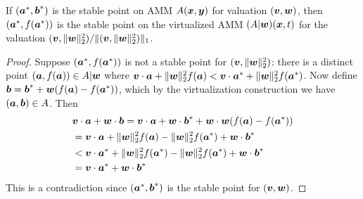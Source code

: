 \begin{lemma}
\sloppy
    If $(\ba^{*},\bb^{*})$ is the stable point on AMM $A(\bx,\by)$ for valuation $(\bv,\bw)$,
    then $(\ba^{*},f(\ba^{*}))$ is the stable point on the virtualized AMM $(A| \bw)(\bx,t)$
    for the valuation $(\bv,\|\bw\|^2_2) / \| (\bv,\|\bw\|^2_2) \|_1$.
\end{lemma}

\begin{proof}
\sloppy
    Suppose $(\ba^{*},f(\ba^{*}))$ is not a stable point for $(\bv,\|\bw\|^2_2)$:
    there is a distinct point $(\ba,f(\ba)) \in A|\bw$ where $\bv \cdot \ba + \|\bw\|^2_2 f(\ba) < \bv \cdot \ba^{*} + \|\bw\|^2_2 f(\ba^{*})$.
    Now define $\bb = \bb^{*} + \bw(f(\ba) - f(\ba^{*}))$, which by the virtualization construction we have $(\ba,\bb) \in A$.
    Then
    \begin{align*}
        &\bv \cdot \ba + \bw \cdot \bb = \bv \cdot \ba + \bw \cdot \bb^{*} + \bw \cdot \bw (f(\ba) - f(\ba^{*})) \\
        &= \bv \cdot \ba + \|\bw\|^2_2 f(\ba) - \|\bw\|^2_2 f(\ba^{*}) + \bw \cdot \bb^{*} \\
        &<  \bv \cdot \ba^{*} + \|\bw\|^2_2 f(\ba^{*}) - \|\bw\|^2_2 f(\ba^{*}) + \bw \cdot \bb^{*}\\
        &= \bv \cdot \ba^{*}  + \bw \cdot \bb^{*}
    \end{align*}
    This is a contradiction since $(\ba^{*},\bb^{*})$ is the stable point for $(\bv,\bw)$.
\end{proof}
